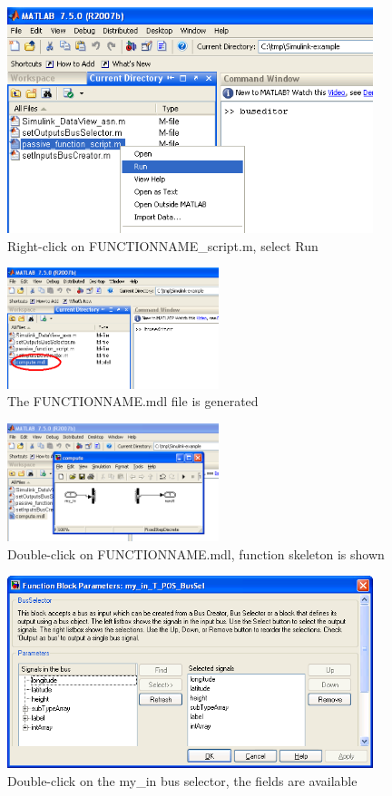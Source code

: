 \documentclass[11pt]{book}
\begin{document}
\begin{figure}
\centering
\includegraphics[width=0.95\textwidth]{imgs/matlab6}
\caption{Right-click on FUNCTIONNAME\_script.m, select Run}
\label{matlab6}
\end{figure}
\begin{figure}
\centering
\includegraphics[width=0.55\textwidth]{imgs/matlab7}
\caption{The FUNCTIONNAME.mdl file is generated}
\label{matlab7}
\end{figure}
\begin{figure}
\centering
\includegraphics[width=0.55\textwidth]{imgs/matlab8}
\caption{Double-click on FUNCTIONNAME.mdl, function skeleton is shown}
\label{matlab8}
\end{figure}
\begin{figure}
\centering
\includegraphics[width=0.95\textwidth]{imgs/matlab9}
\caption{Double-click on the my\_in bus selector, the fields are available}
\label{matlab9}
\end{figure}
\end{document}
